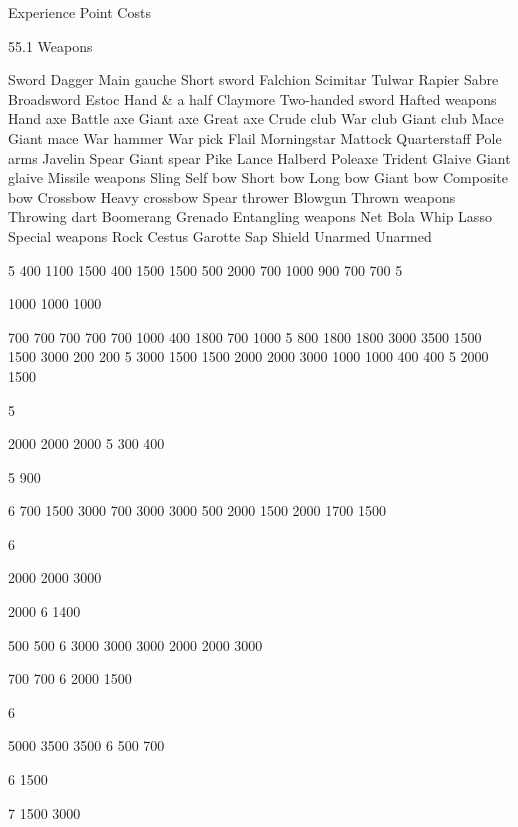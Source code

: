 \begin{Chapter}{Experience Point Costs}

55.1 Weapons 

Sword 
Dagger 
Main gauche 
Short sword 
Falchion 
Scimitar 
Tulwar 
Rapier 
Sabre 
Broadsword 
Estoc 
Hand \& a half 
Claymore 
Two-handed sword 
Hafted weapons 
Hand axe 
Battle axe 
Giant axe 
Great axe 
Crude club 
War club 
Giant club 
Mace 
Giant mace 
War hammer 
War pick 
Flail 
Morningstar 
Mattock 
Quarterstaff 
Pole arms 
Javelin 
Spear 
Giant spear 
Pike 
Lance 
Halberd 
Poleaxe 
Trident 
Glaive 
Giant glaive 
Missile weapons 
Sling 
Self bow 
Short bow 
Long bow 
Giant bow 
Composite bow 
Crossbow 
Heavy crossbow 
Spear thrower 
Blowgun 
Thrown weapons 
Throwing dart 
Boomerang 
Grenado 
Entangling weapons 
Net 
Bola 
Whip 
Lasso 
Special weapons 
Rock 
Cestus 
Garotte 
Sap 
Shield 
Unarmed 
Unarmed 
 

 

5 
400 
1100 
1500 
400 
1500 
1500 
500 
2000 
700 
1000 
900 
700 
700 
5 
  
1000 
1000 
1000 
  
700 
700 
700 
700 
700 
1000 
400 
1800 
700 
1000 
5 
800 
1800 
1800 
3000 
3500 
1500 
1500 
3000 
200 
200 
5 
3000 
1500 
1500 
2000 
2000 
3000 
1000 
1000 
400 
400 
5 
2000 
1500 
  
5 
 
2000 
2000 
2000 
5 
300 
400 
 
  
 
5 
900 

6 
700 
1500 
3000 
700 
3000 
3000 
500 
2000 
1500 
2000 
1700 
1500 
  
6 
  
2000 
2000 
3000 
  
  
  
  
  
  
  
  
  
  
2000 
6 
1400 
  
  
  
  
  
  
  
500 
500 
6 
3000 
3000 
3000 
2000 
2000 
3000 
  
  
700 
700 
6 
2000 
1500 
  
6 
 
5000 
3500 
3500 
6 
500 
700 
 
  
 
6 
1500 

7 
1500 
3000 
  

\end{Chapter}
